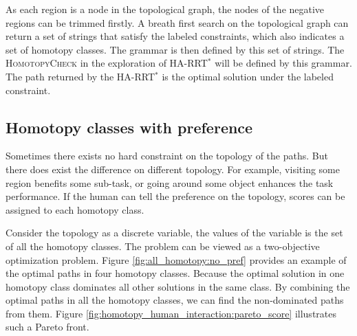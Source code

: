 \documentclass[letterpaper, 10 pt, conference]{ieeeconf}
\begin{document}
As each region is a node in the topological graph, the nodes of the negative regions can be trimmed firstly.
A breath first search on the topological graph can return a set of strings that satisfy the labeled constraints, which also indicates a set of homotopy classes. 
The grammar is then defined by this set of strings.
The \textsc{HomotopyCheck} in the exploration of HA-RRT$^{*}$ will be defined by this grammar.
The path returned by the HA-RRT$^{*}$ is the optimal solution under the labeled constraint.

\subsection{Homotopy classes with preference}

Sometimes there exists no hard constraint on the topology of the paths.
But there does exist the difference on different topology.
For example, visiting some region benefits some sub-task, or going around some object enhances the task performance.
If the human can tell the preference on the topology, scores can be assigned to each homotopy class.

Consider the topology as a discrete variable, the values of the variable is the set of all the homotopy classes.
The problem can be viewed as a two-objective optimization problem.
Figure \ref{fig:all_homotopy:no_pref} provides an example of the optimal paths in four homotopy classes.
Because the optimal solution in one homotopy class dominates all other solutions in the same class.
By combining the optimal paths in all the homotopy classes, we can find the non-dominated paths from them.
Figure \ref{fig:homotopy_human_interaction:pareto_score} illustrates such a Pareto front.
\end{document}
